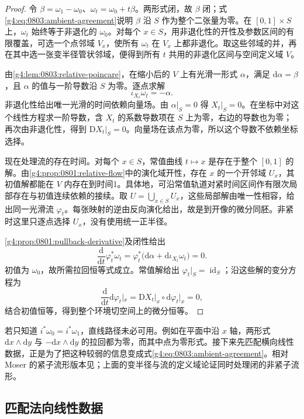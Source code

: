 \begin{proof}
	令 \(\beta=\omega_1-\omega_0\)、\(\omega_t=\omega_0+t\beta\)。两形式闭，故 \(\beta\) 闭；式\eqref{g4:eq:0803:ambient-agreement}说明 \(\beta\) 沿 \(S\) 作为整个二张量为零。在 \([0,1]\times S\) 上，\(\omega_t\) 始终等于非退化的 \(\omega_0\)。对每个 \(x\in S\)，用非退化性的开性及参数区间的有限覆盖，可选一个点邻域 \(V_x\)，使所有 \(\omega_t\) 在 \(V_x\) 上都非退化。取这些邻域的并，再在其中选一张变半径管状邻域，便得到所有 \(t\) 共用的非退化区间与空间定义域 \(V\)。

	由\cref{g4:lem:0803:relative-poincare}，在缩小后的 \(V\) 上有光滑一形式 \(\alpha\)，满足 \(\mathrm{d}\alpha=\beta\)，且 \(\alpha\) 的值与一阶导数沿 \(S\) 为零。逐点求解
	\[
		\iota_{X_t}\omega_t=-\alpha.
	\]
	非退化性给出唯一光滑的时间依赖向量场。由 \(\alpha|_S=0\) 得 \(X_t|_S=0\)。在坐标中对这个线性方程求一阶导数，含 \(X_t\) 的系数导数项在 \(S\) 上为零，右边的导数也为零；再次由非退化性，得到 \(\mathrm{D}X_t|_S=0\)。向量场在该点为零，所以这个导数不依赖坐标选择。

	现在处理流的存在时间。对每个 \(x\in S\)，常值曲线 \(t\mapsto x\) 是存在于整个 \([0,1]\) 的解。由\cref{g4:prop:0801:relative-flow}中的演化域开性，存在 \(x\) 的一个开邻域 \(U_x\)，其初值解都能在 \(V\) 内存在到时间1。具体地，可沿常值轨道对紧时间区间作有限次局部存在与初值连续依赖的接续。取 \(U=\bigcup_{x\in S}U_x\)，这些局部解由唯一性相容，给出同一光滑流 \(\varphi_t\)。每张映射的逆由反向演化给出，故是到开像的微分同胚。非紧时这里只逐点选择 \(U_x\)，没有使用统一正半径。

	\cref{g4:prop:0801:pullback-derivative}及闭性给出
	\[
		\frac{\mathrm{d}}{\mathrm{d}t}\varphi_t^*\omega_t
		=\varphi_t^*\bigl(\mathrm{d}\alpha+\mathrm{d}\iota_{X_t}\omega_t\bigr)=0.
	\]
	初值为 \(\omega_0\)，故所需拉回恒等式成立。常值解给出 \(\varphi_t|_S=\operatorname{id}_S\)；沿这些解的变分方程为
	\[
		\frac{\mathrm{d}}{\mathrm{d}t}\mathrm{d}\varphi_t|_x
		=\mathrm{D}X_t|_x\circ\mathrm{d}\varphi_t|_x=0,
	\]
	结合初值恒等，得到整个环境切空间上的微分恒等。
\end{proof}

若只知道 \(i^*\omega_0=i^*\omega_1\)，直线路径未必可用。例如在平面中沿 \(x\) 轴，两形式 \(\mathrm{d}x\wedge\mathrm{d}y\) 与 \(-\mathrm{d}x\wedge\mathrm{d}y\) 的拉回都为零，而其中点为零形式。接下来先匹配横向线性数据，正是为了把这种较弱的信息变成式\eqref{g4:eq:0803:ambient-agreement}。相对 Moser 的紧子流形版本见\cite[定理1.8，第90页]{Cannas2006Symplectic}；上面的变半径与流的定义域论证同时处理闭的非紧子流形。

\subsection{匹配法向线性数据}
\label{g4:subsec:0803:02}

